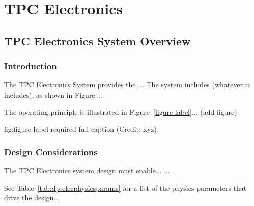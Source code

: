\chapter{TPC Electronics}
\label{ch:fddp-tpc-elec}


\section{TPC Electronics System Overview}
\label{sec:fddp-tpc-elec-ov}


\subsection{Introduction}
\label{sec:fddp-tpc-elec-intro}

The TPC Electronics System provides the ...
The system includes (whatever it includes), as shown in Figure.... 


The operating principle is illustrated in Figure~\ref{figure-label}... (add figure)

\begin{dunefigure}{fig:figure-label}
{required full caption (Credit: xyz)}
\end{dunefigure}

\subsection{Design Considerations}
\label{sec:fddp-tpc-elec-des-consid}


The TPC Electronics system design must enable... 
...


See Table~\ref{tab:dp-elecphysicsparams} for a list of the physics parameters that drive the design...

